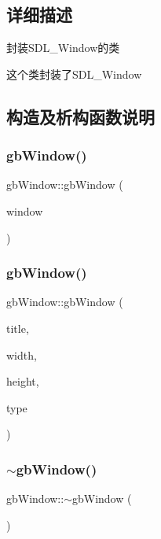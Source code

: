 \subsection{详细描述}
封装\+S\+D\+L\+\_\+\+Window的类 

这个类封装了\+S\+D\+L\+\_\+\+Window 

\subsection{构造及析构函数说明}
\mbox{\label{classgb_window_a08e5afeb1a8c049610b57be380b6403a}} 
\subsubsection{\texorpdfstring{gbWindow()}{gbWindow()}\hspace{0.1cm}{\footnotesize\ttfamily [1/2]}}
{\footnotesize\ttfamily gb\+Window\+::gb\+Window (\begin{DoxyParamCaption}\item[{S\+D\+L\+\_\+\+Window $\ast$}]{window }\end{DoxyParamCaption})}

\mbox{\label{classgb_window_adc21ef6f5b7f1231568affe0b4554cd2}} 
\subsubsection{\texorpdfstring{gbWindow()}{gbWindow()}\hspace{0.1cm}{\footnotesize\ttfamily [2/2]}}
{\footnotesize\ttfamily gb\+Window\+::gb\+Window (\begin{DoxyParamCaption}\item[{string}]{title,  }\item[{int}]{width,  }\item[{int}]{height,  }\item[{Uint8}]{type }\end{DoxyParamCaption})}

\mbox{\label{classgb_window_acd0d49bdf1dbe7df86e02ba82a318571}} 
\subsubsection{\texorpdfstring{$\sim$gbWindow()}{~gbWindow()}}
{\footnotesize\ttfamily gb\+Window\+::$\sim$gb\+Window (\begin{DoxyParamCaption}{ }\end{DoxyParamCaption})}



